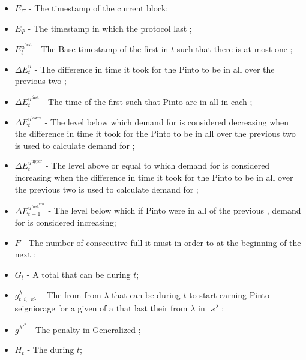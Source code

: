 \documentclass[class=article, crop=false]{standalone}
\begin{document}
\begin{itemize}[topsep=0pt, itemsep=3pt,leftmargin=16pt]
    \item[] $E_{\Xi}$ - The timestamp of the current block;
    \item[] $E_\Psi$ - The timestamp in which the protocol last ;
    \item[] $E_{t}^{u^{\text{first}}}$ - The Base timestamp of the first  in $t$ such that there is at most one ;
    \item[] $\Delta E_{t}^{u}$ - The difference in time it took for the Pinto to be  in all  over the previous two ;
    \item[] $\Delta E_{t}^{u^{\text{first}}}$ - The time of the first  such that Pinto are  in all  in each ;
    \item[] $\Delta E_{t}^{u^{\text{lower}}}$ - The level below which demand for  is considered decreasing when the difference in time it took for the Pinto to be  in all  over the previous two  is used to calculate demand for ;
    \item[] $\Delta E_{t}^{u^{\text{upper}}}$ - The level above or equal to which demand for  is considered increasing when the difference in time it took for the Pinto to be  in all  over the previous two  is used to calculate demand for ;
    \item[] $\Delta E_{t-1}^{u^{\text{first}^{\text{max}}}}$ - The level below which if Pinto were  in all  of the previous , demand for  is considered increasing;
    \item[] $F$ - The number of consecutive full  it must  in order to  at the beginning of the next ;
    \item[] $G_{t}$ - A  total  that can be  during $t$;
    \item[] $g_{t,i,\varkappa^{\lambda}}^{\lambda}$ - The  from  from $\lambda$  that can be  during $t$ to start earning Pinto seigniorage for a given  of a  that last  their  from $\lambda$  in $\varkappa^{\lambda}$;
    \item[] $g^{\lambda'^{*}}$ - The  penalty in Generalized ;
    \item[] $H_{t}$ - The  during $t$;

\end{itemize}
\end{document}
